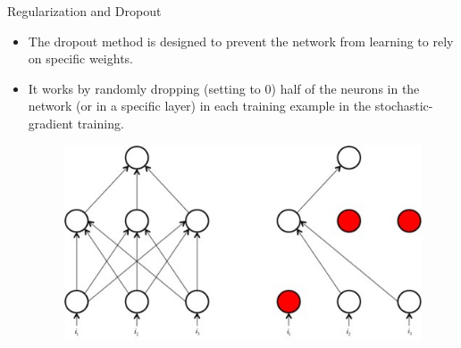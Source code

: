 \documentclass[handout]{beamer}
\begin{document}
\begin{frame}{Regularization and Dropout}
\begin{scriptsize}
\begin{itemize}

\item The dropout method is designed to prevent the network from learning to rely on specific weights.

\item It works by randomly dropping (setting to 0) half of the neurons in the network (or in a specific layer) in each training example in the stochastic-gradient training.


 \begin{figure}[htb]
	\centering
	 \includegraphics[scale=0.45]{pics/drop-out-in-neural-networks.jpg}
\end{figure}


\end{itemize}
\end{scriptsize}
\end{frame}
\end{document}
